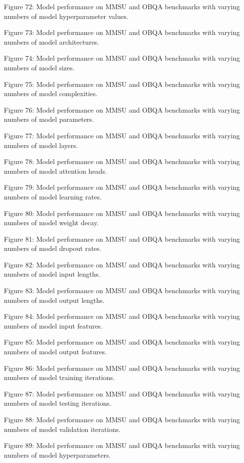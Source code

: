         Figure 72: Model performance on MMSU and OBQA benchmarks with varying numbers of model hyperparameter values.

        Figure 73: Model performance on MMSU and OBQA benchmarks with varying numbers of model architectures.

        Figure 74: Model performance on MMSU and OBQA benchmarks with varying numbers of model sizes.

        Figure 75: Model performance on MMSU and OBQA benchmarks with varying numbers of model complexities.

        Figure 76: Model performance on MMSU and OBQA benchmarks with varying numbers of model parameters.

        Figure 77: Model performance on MMSU and OBQA benchmarks with varying numbers of model layers.

        Figure 78: Model performance on MMSU and OBQA benchmarks with varying numbers of model attention heads.

        Figure 79: Model performance on MMSU and OBQA benchmarks with varying numbers of model learning rates.

        Figure 80: Model performance on MMSU and OBQA benchmarks with varying numbers of model weight decay.

        Figure 81: Model performance on MMSU and OBQA benchmarks with varying numbers of model dropout rates.

        Figure 82: Model performance on MMSU and OBQA benchmarks with varying numbers of model input lengths.

        Figure 83: Model performance on MMSU and OBQA benchmarks with varying numbers of model output lengths.

        Figure 84: Model performance on MMSU and OBQA benchmarks with varying numbers of model input features.

        Figure 85: Model performance on MMSU and OBQA benchmarks with varying numbers of model output features.

        Figure 86: Model performance on MMSU and OBQA benchmarks with varying numbers of model training iterations.

        Figure 87: Model performance on MMSU and OBQA benchmarks with varying numbers of model testing iterations.

        Figure 88: Model performance on MMSU and OBQA benchmarks with varying numbers of model validation iterations.

        Figure 89: Model performance on MMSU and OBQA benchmarks with varying numbers of model hyperparameters.

